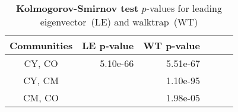 \begin{table}[htb]
\small
\centering
\caption[Kolmogorov-Smirnov test]{\textbf{Kolmogorov-Smirnov test} $p$-values for leading eigenvector~(LE) and walktrap~(WT)}
\label{tab:n3-pvalues2}
\vspace*{5mm}
\begin{tabular}{crrrrr}
	\toprule
	 Communities & LE p-value & WT p-value\\
	\midrule 
    CY, CO & 5.10e-66 & 5.51e-67\\
    CY, CM &          & 1.10e-95\\
    CM, CO &          & 1.98e-05\\ 
	\bottomrule
\end{tabular}
\end{table}